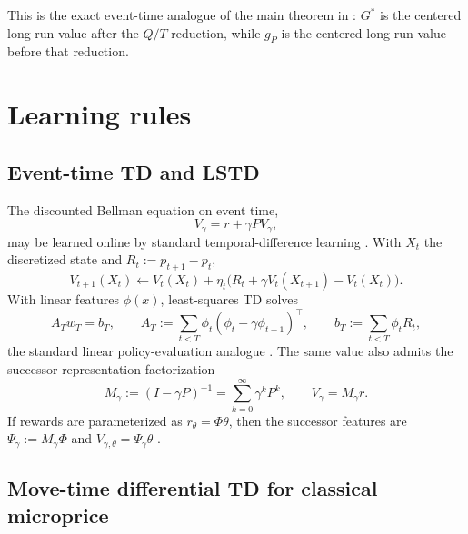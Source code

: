 \documentclass[11pt,twoside]{article}
\theoremstyle{plain}
\theoremstyle{definition}
\theoremstyle{remark}
\newcommand{\1}{\mathbf{1}}
\begin{document}
This is the exact event-time analogue of the main theorem in \cite{Petersen2025}: $G^*$ is the centered long-run value after the $Q/T$ reduction, while $g_P$ is the centered long-run value before that reduction.
\section{Learning rules}

\subsection{Event-time TD and LSTD}

The discounted Bellman equation on event time,
\[
V_\gamma=r+\gamma PV_\gamma,
\]
may be learned online by standard temporal-difference learning \cite{Sutton1988}. With $X_t$ the discretized state and $R_t:=p_{t+1}-p_t$,
\begin{equation}\label{eq:td0}
V_{t+1}(X_t)
\leftarrow
V_t(X_t)+\eta_t\bigl(R_t+\gamma V_t(X_{t+1})-V_t(X_t)\bigr).
\end{equation}
With linear features $\phi(x)$, least-squares TD solves
\begin{equation}\label{eq:lstd}
A_T w_T=b_T,
\qquad
A_T:=\sum_{t<T}\phi_t(\phi_t-\gamma\phi_{t+1})^\top,
\qquad
b_T:=\sum_{t<T}\phi_t R_t,
\end{equation}
the standard linear policy-evaluation analogue \cite{BradtkeBarto1996}. The same value also admits the successor-representation factorization \cite{Dayan1993}
\begin{equation}\label{eq:sr}
M_\gamma:=(I-\gamma P)^{-1}=
\sum_{k=0}^{\infty}\gamma^k P^k,
\qquad
V_\gamma=M_\gamma r.
\end{equation}
If rewards are parameterized as $r_\theta=\Phi\theta$, then the successor features are $\Psi_\gamma:=M_\gamma\Phi$ and $V_{\gamma,\theta}=\Psi_\gamma\theta$ \cite{Barreto2018}.

\subsection{Move-time differential TD for classical microprice}
\end{document}
